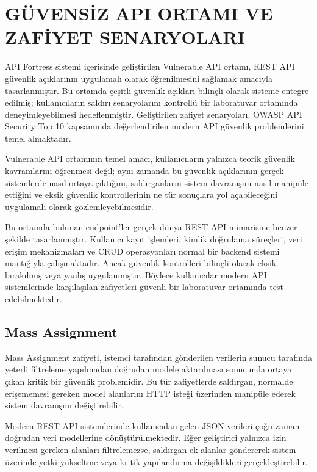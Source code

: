 \section{GÜVENSİZ API ORTAMI VE ZAFİYET SENARYOLARI}
\label{bolum6}

API Fortress sistemi içerisinde geliştirilen Vulnerable API ortamı, REST API güvenlik açıklarının uygulamalı olarak öğrenilmesini sağlamak amacıyla tasarlanmıştır. Bu ortamda çeşitli güvenlik açıkları bilinçli olarak sisteme entegre edilmiş; kullanıcıların saldırı senaryolarını kontrollü bir laboratuvar ortamında deneyimleyebilmesi hedeflenmiştir. Geliştirilen zafiyet senaryoları, OWASP API Security Top 10 kapsamında değerlendirilen modern API güvenlik problemlerini temel almaktadır.

Vulnerable API ortamının temel amacı, kullanıcıların yalnızca teorik güvenlik kavramlarını öğrenmesi değil; aynı zamanda bu güvenlik açıklarının gerçek sistemlerde nasıl ortaya çıktığını, saldırganların sistem davranışını nasıl manipüle ettiğini ve eksik güvenlik kontrollerinin ne tür sonuçlara yol açabileceğini uygulamalı olarak gözlemleyebilmesidir.

Bu ortamda bulunan endpoint’ler gerçek dünya REST API mimarisine benzer şekilde tasarlanmıştır. Kullanıcı kayıt işlemleri, kimlik doğrulama süreçleri, veri erişim mekanizmaları ve CRUD operasyonları normal bir backend sistemi mantığıyla çalışmaktadır. Ancak güvenlik kontrolleri bilinçli olarak eksik bırakılmış veya yanlış uygulanmıştır. Böylece kullanıcılar modern API sistemlerinde karşılaşılan zafiyetleri güvenli bir laboratuvar ortamında test edebilmektedir.

\subsection{Mass Assignment}
\label{mass-assignment}

Mass Assignment zafiyeti, istemci tarafından gönderilen verilerin sunucu tarafında yeterli filtreleme yapılmadan doğrudan modele aktarılması sonucunda ortaya çıkan kritik bir güvenlik problemidir. Bu tür zafiyetlerde saldırgan, normalde erişememesi gereken model alanlarını HTTP isteği üzerinden manipüle ederek sistem davranışını değiştirebilir.

Modern REST API sistemlerinde kullanıcıdan gelen JSON verileri çoğu zaman doğrudan veri modellerine dönüştürülmektedir. Eğer geliştirici yalnızca izin verilmesi gereken alanları filtrelemezse, saldırgan ek alanlar göndererek sistem üzerinde yetki yükseltme veya kritik yapılandırma değişiklikleri gerçekleştirebilir.

